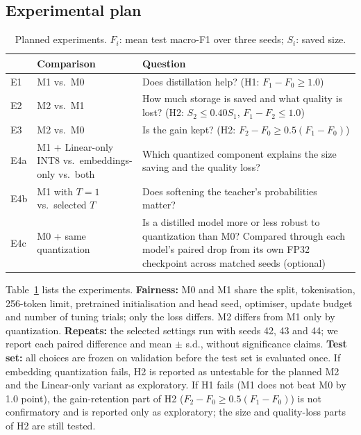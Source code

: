 \documentclass[11pt]{article}
\begin{document}
\subsection{Experimental plan}
\begin{table}[t]
\centering\small
\begin{tabularx}{\columnwidth}{@{}l>{\raggedright\arraybackslash}p{1.6cm}>{\raggedright\arraybackslash}X@{}}
\toprule
& Comparison & Question \\
\midrule
E1 & M1 vs.\ M0 & Does distillation help? (H1: $F_1-F_0\geq1.0$) \\
E2 & M2 vs.\ M1 & How much storage is saved and what quality is lost? (H2: $S_2\leq0.40S_1$, $F_1-F_2\leq1.0$) \\
E3 & M2 vs.\ M0 & Is the gain kept? (H2: $F_2-F_0\geq0.5(F_1-F_0)$) \\
E4a & M1 + Linear-only INT8 vs.\ embeddings-only vs.\ both & Which quantized component explains the size saving and the quality loss? \\
E4b & M1 with $T{=}1$ vs.\ selected $T$ & Does softening the teacher's probabilities matter? \\
E4c & M0 + same quantization & Is a distilled model more or less robust to quantization than M0? Compared through each model's paired drop from its own FP32 checkpoint across matched seeds (optional) \\
\bottomrule
\end{tabularx}
\caption{Planned experiments. $F_i$: mean test macro-F1 over three seeds; $S_i$: saved size.}
\label{tab:exp}
\end{table}

Table~\ref{tab:exp} lists the experiments. \textbf{Fairness:} M0 and M1 share the split, tokenisation, 256-token limit, pretrained initialisation and head seed, optimiser, update budget and number of tuning trials; only the loss differs. M2 differs from M1 only by quantization. \textbf{Repeats:} the selected settings run with seeds 42, 43 and 44; we report each paired difference and mean $\pm$ s.d., without significance claims. \textbf{Test set:} all choices are frozen on validation before the test set is evaluated once. If embedding quantization fails, H2 is reported as untestable for the planned M2 and the Linear-only variant as exploratory. If H1 fails (M1 does not beat M0 by 1.0 point), the gain-retention part of H2 ($F_2-F_0\geq0.5(F_1-F_0)$) is not confirmatory and is reported only as exploratory; the size and quality-loss parts of H2 are still tested.
\end{document}
